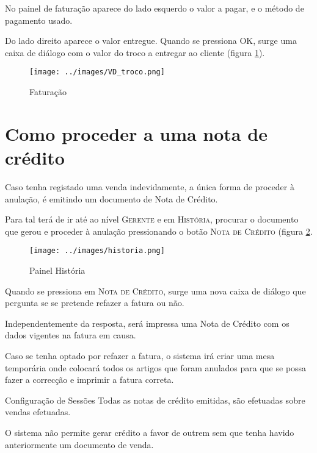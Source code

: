 \documentclass[a4paper,11pt,openany]{memoir}
\begin{document}
No painel de faturação aparece do lado esquerdo o valor a pagar, e o método de pagamento usado.

Do lado direito aparece o valor entregue. Quando se pressiona \textsc{OK}, surge uma caixa de diálogo com o valor do troco a entregar ao cliente (figura \ref{fatura}).


\begin{figure}
\begin{center}
\texttt{[image: ../images/VD\_troco.png]}
\caption[Submanifold]{Faturação}
\label{fatura}
\end{center}
\end{figure}





\section{Como proceder a uma nota de crédito}

Caso tenha registado uma venda indevidamente, a única forma de proceder à anulação, é emitindo um documento de Nota de Crédito.

Para tal terá de ir até ao nível \textsc{Gerente} e em \textsc{História}, procurar o documento que gerou e proceder à anulação pressionando o botão \textsc{Nota de Crédito} (figura \ref{Historia}.


\begin{figure}
\begin{center}
\texttt{[image: ../images/historia.png]}
\caption[Submanifold]{Painel História}
\label{Historia}
\end{center}
\end{figure}


Quando se pressiona em  \textsc{Nota de Crédito}, surge uma nova caixa de diálogo que pergunta se se pretende refazer a fatura ou não.

Independentemente da resposta, será impressa uma Nota de Crédito com os dados vigentes na fatura em causa. 

Caso se tenha optado por refazer a fatura, o sistema irá criar uma mesa temporária onde colocará todos os artigos que foram anulados para que se possa fazer a correcção e imprimir a fatura correta.


\begin{bclogo}[couleur=blue!10,arrondi=0.1,logo=\bclampe,ombre=true]{Configuração de Sessões}
Todas as notas de crédito emitidas, são efetuadas sobre vendas efetuadas.

O sistema não permite gerar crédito a favor de outrem sem que tenha havido anteriormente um documento de venda.
\end{bclogo}
\end{document}
